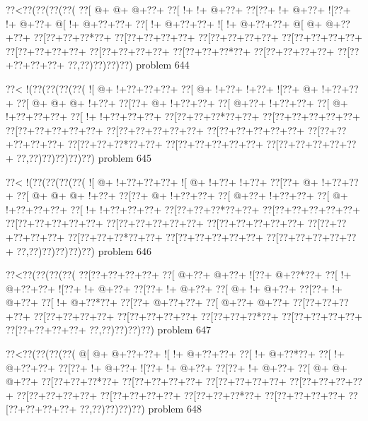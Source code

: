 \vbox{\vbox{\goo
\0??<\0??(\0??(\0??(\0??(
\0??[\- @+\- @+\- @+\0??+
\0??[\- !+\- !+\- @+\0??+
\0??[\0??+\- !+\- @+\0??+
\- ![\0??+\- !+\- @+\0??+
\- @[\- !+\- @+\0??+\0??+
\0??[\- !+\- @+\0??+\0??+
\- ![\- !+\- @+\0??+\0??+
\- @[\- @+\- @+\0??+\0??+
\0??[\0??+\0??+\0??*\0??+
\0??[\0??+\0??+\0??+\0??+
\0??[\0??+\0??+\0??+\0??+
\0??[\0??+\0??+\0??+\0??+
\0??[\0??+\0??+\0??+\0??+
\0??[\0??+\0??+\0??+\0??+
\0??[\0??+\0??+\0??*\0??+
\0??[\0??+\0??+\0??+\0??+
\0??[\0??+\0??+\0??+\0??+
\0??,\0??)\0??)\0??)\0??)
}
\hfil problem 644\hfil\break
}

\vbox{\vbox{\goo
\0??<\- !(\0??(\0??(\0??(\0??(
\- ![\- @+\- !+\0??+\0??+\0??+
\0??[\- @+\- !+\0??+\- !+\0??+
\- ![\0??+\- @+\- !+\0??+\0??+
\0??[\- @+\- @+\- @+\- !+\0??+
\0??[\0??+\- @+\- !+\0??+\0??+
\0??[\- @+\0??+\- !+\0??+\0??+
\0??[\- @+\- !+\0??+\0??+\0??+
\0??[\- !+\- !+\0??+\0??+\0??+
\0??[\0??+\0??+\0??*\0??+\0??+
\0??[\0??+\0??+\0??+\0??+\0??+
\0??[\0??+\0??+\0??+\0??+\0??+
\0??[\0??+\0??+\0??+\0??+\0??+
\0??[\0??+\0??+\0??+\0??+\0??+
\0??[\0??+\0??+\0??+\0??+\0??+
\0??[\0??+\0??+\0??*\0??+\0??+
\0??[\0??+\0??+\0??+\0??+\0??+
\0??[\0??+\0??+\0??+\0??+\0??+
\0??,\0??)\0??)\0??)\0??)\0??)
}
\hfil problem 645\hfil\break
}

\vbox{\vbox{\goo
\0??<\- !(\0??(\0??(\0??(\0??(
\- ![\- @+\- !+\0??+\0??+\0??+
\- ![\- @+\- !+\0??+\- !+\0??+
\0??[\0??+\- @+\- !+\0??+\0??+
\0??[\- @+\- @+\- @+\- !+\0??+
\0??[\0??+\- @+\- !+\0??+\0??+
\0??[\- @+\0??+\- !+\0??+\0??+
\0??[\- @+\- !+\0??+\0??+\0??+
\0??[\- !+\- !+\0??+\0??+\0??+
\0??[\0??+\0??+\0??*\0??+\0??+
\0??[\0??+\0??+\0??+\0??+\0??+
\0??[\0??+\0??+\0??+\0??+\0??+
\0??[\0??+\0??+\0??+\0??+\0??+
\0??[\0??+\0??+\0??+\0??+\0??+
\0??[\0??+\0??+\0??+\0??+\0??+
\0??[\0??+\0??+\0??*\0??+\0??+
\0??[\0??+\0??+\0??+\0??+\0??+
\0??[\0??+\0??+\0??+\0??+\0??+
\0??,\0??)\0??)\0??)\0??)\0??)
}
\hfil problem 646\hfil\break
}

\vbox{\vbox{\goo
\0??<\0??(\0??(\0??(\0??(
\0??[\0??+\0??+\0??+\0??+
\0??[\- @+\0??+\- @+\0??+
\- ![\0??+\- @+\0??*\0??+
\0??[\- !+\- @+\0??+\0??+
\- ![\0??+\- !+\- @+\0??+
\0??[\0??+\- !+\- @+\0??+
\0??[\- @+\- !+\- @+\0??+
\0??[\0??+\- !+\- @+\0??+
\0??[\- !+\- @+\0??*\0??+
\0??[\0??+\- @+\0??+\0??+
\0??[\- @+\0??+\- @+\0??+
\0??[\0??+\0??+\0??+\0??+
\0??[\0??+\0??+\0??+\0??+
\0??[\0??+\0??+\0??+\0??+
\0??[\0??+\0??+\0??*\0??+
\0??[\0??+\0??+\0??+\0??+
\0??[\0??+\0??+\0??+\0??+
\0??,\0??)\0??)\0??)\0??)
}
\hfil problem 647\hfil\break
}

\vbox{\vbox{\goo
\0??<\0??(\0??(\0??(\0??(
\- @[\- @+\- @+\0??+\0??+
\- ![\- !+\- @+\0??+\0??+
\0??[\- !+\- @+\0??*\0??+
\0??[\- !+\- @+\0??+\0??+
\0??[\0??+\- !+\- @+\0??+
\- ![\0??+\- !+\- @+\0??+
\0??[\0??+\- !+\- @+\0??+
\0??[\- @+\- @+\- @+\0??+
\0??[\0??+\0??+\0??*\0??+
\0??[\0??+\0??+\0??+\0??+
\0??[\0??+\0??+\0??+\0??+
\0??[\0??+\0??+\0??+\0??+
\0??[\0??+\0??+\0??+\0??+
\0??[\0??+\0??+\0??+\0??+
\0??[\0??+\0??+\0??*\0??+
\0??[\0??+\0??+\0??+\0??+
\0??[\0??+\0??+\0??+\0??+
\0??,\0??)\0??)\0??)\0??)
}
\hfil problem 648\hfil\break
}

